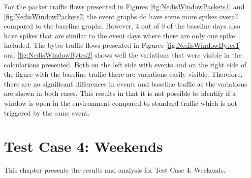 For the packet traffic flows presented in Figures \ref{fig:NedisWindowPackets1} and \ref{fig:NedisWindowPackets2} the event graphs do have some more spikes overall compared to the baseline graphs. However, 4 out of 9 of the baseline days also have spikes that are similar to the event days where there are only one spike included. The bytes traffic flows presented in Figures \ref{fig:NedisWindowBytes1} and \ref{fig:NedisWindowBytes2} shows well the variations that were visible in the calculations presented. Both on the left side with events and on the right side of the figure with the baseline traffic there are variations easily visible. Therefore, there are no significant differences in events and baseline traffic as the variations are shown in both cases. This results in that it is not possible to identify if a window is open in the environment compared to standard traffic which is not triggered by the same event. 


\newpage
\section{Test Case 4: Weekends}
This chapter presents the results and analysis for Test Case 4: Weekends. 

